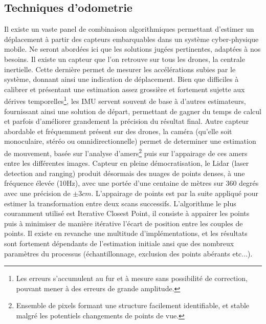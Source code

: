 \documentclass[twoside,twocolumn]{article}
\begin{document}
\subsection{Techniques d'odometrie}
Il existe un vaste panel de combinaison algorithmiques permettant d'estimer un déplacement à partir des capteurs embarquables dans un système cyber-physique mobile.
Ne seront abordées ici que les solutions jugées pertinentes, adaptées à nos besoins.
Il existe un capteur que l'on retrouve sur tous les drones, la centrale inertielle. Cette dernière permet de mesurer les accélérations subies par le système,
donnant ainsi une indication de déplacement. Bien que difficiles à calibrer et présentant une estimation assez grossière et fortement sujette aux
dérives temporelles\footnote{Les erreurs s'accumulent au fur et à mesure sans possibilité de correction, pouvant mener à des erreurs de grande amplitude.},
les IMU servent souvent de base à d'autres estimateurs,
fournissant ainsi une solution de départ, permettant de gagner du temps de calcul et parfois d'améliorer grandement la précision du résultat final.
Autre capteur abordable et fréquemment présent sur des drones, la caméra (qu'elle soit monoculaire, stéréo ou omnidirectionnelle) permet de determiner une
estimation de mouvement, basée sur l'analyse d'amers\footnote{Ensemble de pixels formant une structure facilement identifiable,
 et stable malgré les potentiels changements de points de vue.}\cite{lindeberg_feature_1998} puis sur l'appairage de ces amers\cite{baumberg_reliable_2000}
entre les différentes images.
Capteur en pleine démocratisation, le Lidar (laser detection and ranging) produit désormais des nuages de points denses, à une fréquence élevée (10Hz), avec une portée d'une centaine de mètres sur 360 degrés avec une précision de $\pm 3cm$. L'appairage de points est par la suite appliqué pour estimer
la transformation entre deux scans successifs. L'algorithme le plus couramment utilisé est Iterative Closest Point, il consiste à appairer les points puis
à minimiser de manière itérative l'écart de position entre les couples de points. Il existe en revanche une multitude d'implémentations, et les résultats sont fortement dépendants de l'estimation initiale ansi que des nombreux paramètres du processus (échantillonnage, exclusion des points abérants etc...)\cite{pomerleau_review_2015}.
\end{document}

